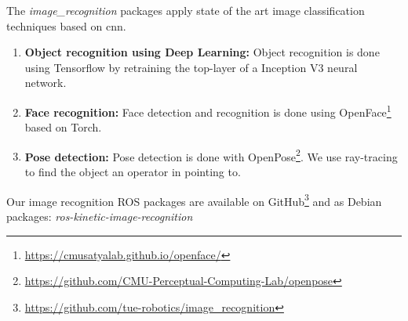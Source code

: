 The \emph{image\_recognition} packages apply state of the art image classification techniques based on \acrfull{cnn}.
\begin{enumerate}

\item \textbf{Object recognition using Deep Learning:} Object recognition is done using Tensorflow\texttrademark\hspace{0em} by retraining the top-layer of a Inception V3 neural network.

\item \textbf{Face recognition:} Face detection and recognition is done using OpenFace\footnote{\url{https://cmusatyalab.github.io/openface/}} based on Torch.
\item \textbf{Pose detection:} Pose detection is done with OpenPose\footnote{\url{https://github.com/CMU-Perceptual-Computing-Lab/openpose}}. We use ray-tracing to find the object an operator in pointing to. 
\end{enumerate}
Our image recognition ROS packages are available on GitHub\footnote{\url{https://github.com/tue-robotics/image_recognition}} and as Debian packages: \emph{ros-kinetic-image-recognition}
